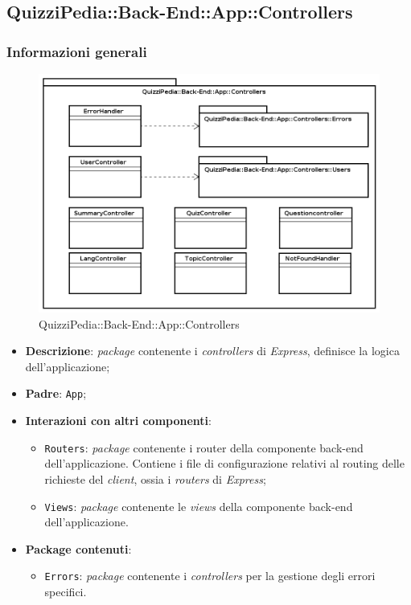 \subsection{QuizziPedia::Back-End::App::Controllers}
\subsubsection{Informazioni generali}
\label{QuizziPedia::Back-End::App::Controllers}
\begin{figure}[ht]
	\centering
	\includegraphics[scale=0.6]{UML/Package/QuizziPedia_Back-End_App_Controllers.png}
	\caption{QuizziPedia::Back-End::App::Controllers}
\end{figure}
\FloatBarrier
	\begin{itemize}
		\item \textbf{Descrizione}:
		\textit{package} contenente i \textit{controllers} di \textit{Express}, definisce la logica dell'applicazione;
		\item \textbf{Padre}: \texttt{App};
		\item \textbf{Interazioni con altri componenti}:
			\begin{itemize}
				\item \texttt{Routers}:
				\textit{package} contenente i router della componente back-end dell'applicazione. Contiene i file di configurazione relativi al routing delle richieste del \textit{client}, ossia i \textit{routers} di \textit{Express};
				\item \texttt{Views}:
				\textit{package} contenente le \textit{\textit{views}} della componente back-end dell'applicazione.
			\end{itemize}
		\item \textbf{Package contenuti}:
			\begin{itemize}
				\item \texttt{Errors}:
				\textit{package} contenente i \textit{controllers} per la gestione degli errori specifici.
			\end{itemize}
	\end{itemize}
